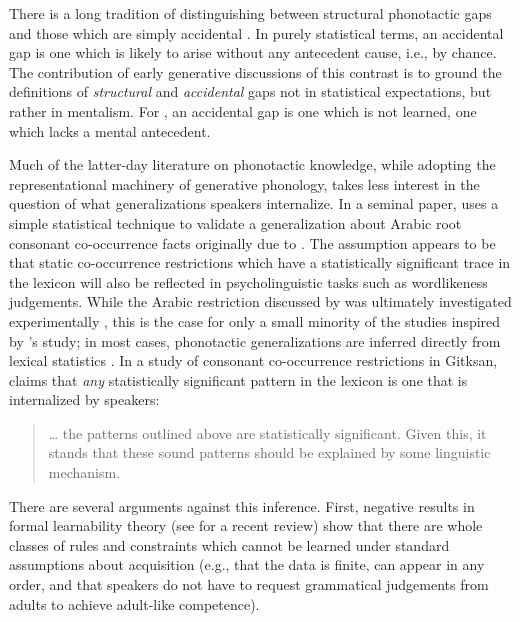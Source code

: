 \label{turkish}

There is a long tradition of distinguishing between structural phonotactic gaps and those which are simply accidental \citep[e.g.,][]{Fischer-Jorgensen1952,Saporta1955,Saporta1958,Vogt1954}. In purely statistical terms, an accidental gap is one which is likely to arise without any antecedent cause, i.e., by chance. The contribution of early generative discussions of this contrast \citep[e.g.,][]{Halle1962,Chomsky1965,SPE} is to ground the definitions of \emph{structural} and \emph{accidental} gaps not in statistical expectations, but rather in mentalism. For \citeauthor{SPE}, an accidental gap is one which is not learned, one which lacks a mental antecedent.

Much of the latter-day literature on phonotactic knowledge, while adopting the representational machinery of generative phonology, takes less interest in the question of what generalizations speakers internalize. In a seminal paper, \citet{McCarthy1988} uses a simple statistical technique to validate a generalization about Arabic root consonant co-occurrence facts originally due to \citet{Greenberg1950}. The assumption appears to be that static co-occurrence restrictions which have a statistically significant trace in the lexicon will also be reflected in psycholinguistic tasks such as wordlikeness judgements. While the Arabic restriction discussed by \citeauthor{McCarthy1988} was ultimately investigated experimentally \citep{Frisch2004}, this is the case for only a small minority of the studies inspired by \citeauthor{McCarthy1988}'s study; in most cases, phonotactic generalizations are inferred directly from lexical statistics \citep[e.g.,][]{Anttila2008a,Berkley1994b,Berkley1994a,Berkley2000,Brown2010,Buckley1997,Coetzee2008a,Elmedlaoui1995,Graff2011,MacEachern1999,Kinney2005,Kawahara2006,Martin2007,Martin2011,Mester1988,Miller-Ockhuizen2003,Padgett1992,Padgett1995,Pozdniakov2007,Yip1989}. In a study of consonant co-occurrence restrictions in Gitksan, \citet{Brown2010} claims that \emph{any} statistically significant pattern in the lexicon is one that is internalized by speakers:

\begin{quote}
\ldots{} the patterns outlined above are statistically significant. Given this, it stands that these sound patterns should be explained by some linguistic mechanism. \citep[][48]{Brown2010}
\end{quote}

There are several arguments against this inference. First, negative results in formal learnability theory (see \citealt{Yang2012} for a recent review) show that there are whole classes of rules and constraints which cannot be learned under standard assumptions about acquisition (e.g., that the data is finite, can appear in any order, and that speakers do not have to request grammatical judgements from adults to achieve adult-like competence). 

